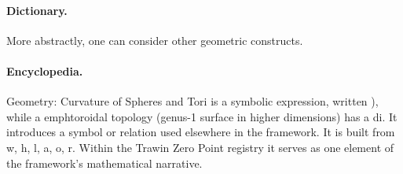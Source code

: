 \paragraph{Dictionary.}
More abstractly, one can consider other geometric constructs.

\paragraph{Encyclopedia.}
Geometry: Curvature of Spheres and Tori is a symbolic expression, written ), while a emphtoroidal topology (genus-1 surface in higher dimensions) has a di. It introduces a symbol or relation used elsewhere in the framework. It is built from w, h, l, a, o, r. Within the Trawin Zero Point registry it serves as one element of the framework's mathematical narrative.
